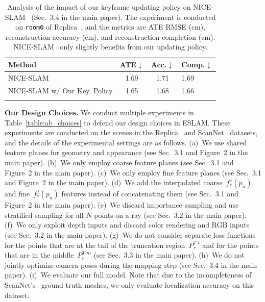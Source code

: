 \begin{table}[t]
    \begin{center}
        \begin{tabular}{l|ccl}
            \Xhline{2\arrayrulewidth}
            \small Method & \small ATE$\downarrow$ & \small Acc.$\downarrow$ & \small Comp.$\downarrow$ \\

            \hline
            \small NICE-SLAM~\cite{zhu2022nice} & 1.69 & 1.71 & 1.69 \\
            \small NICE-SLAM w/ Our Key. Policy & 1.65 & 1.68 & 1.66 \\

            \Xhline{2\arrayrulewidth}
        \end{tabular}
    \end{center}
    \caption{Analysis of the impact of our keyframe updating policy on NICE-SLAM~\cite{zhu2022nice} (Sec.~3.4 in the main paper). The experiment is conducted on \texttt{room0} of Replica~\cite{replica19arxiv}, and the metrics are ATE RMSE (cm), reconstruction accuracy (cm), and reconstruction completion (cm). NICE-SLAM~\cite{zhu2022nice} only slightly benefits from our updating policy.}
    \label{table:ab_key}
\end{table}

\vspace{1ex}
\noindent\textbf{Our Design Choices.} We conduct multiple experiments in Table~\ref{table:ab_choices} to defend our design choices in ESLAM. These experiments are conducted on the scenes in the Replica~\cite{replica19arxiv} and ScanNet~\cite{dai2017scannet} datasets, and the details of the experimental settings are as follows. (a)~We use shared feature planes for geometry and appearance (see Sec.~3.1 and Figure~2 in the main paper). (b)~We only employ coarse feature planes (see Sec.~3.1 and Figure~2 in the main paper). (c)~We only employ fine feature planes (see Sec.~3.1 and Figure~2 in the main paper). (d)~We add the interpolated coarse~$f^{c}_{*}(p_{n})$ and fine~$f^{f}_{*}(p_{n})$ features instead of concatenating them (see Sec.~3.1 and Figure~2 in the main paper). (e)~We discard importance sampling and use stratified sampling for all $N$ points on a ray (see Sec.~3.2 in the main paper). (f)~We only exploit depth inputs and discard color rendering and RGB inputs (see Sec.~3.2 in the main paper). (g)~We do not consider separate loss functions for the points that are at the tail of the truncation region~$P_{r}^{T\text{-}t}$ and for the points that are in the middle~$P_{r}^{T\text{-}m}$ (see Sec.~3.3 in the main paper). (h)~We do not jointly optimize camera poses during the mapping step (see Sec.~3.4 in the main paper). (i)~We evaluate our full model. Note that due to the incompleteness of ScanNet's~\cite{dai2017scannet} ground truth meshes, we only evaluate localization accuracy on this dataset.

